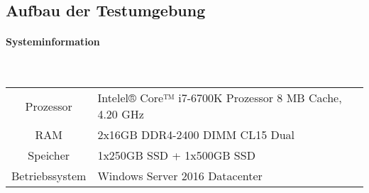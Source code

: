 %
\subsection{Aufbau der Testumgebung}
\paragraph{Systeminformation}\\
\begin{table}[htb]
\begin{tabularx}{\textwidth}{cXX}
Prozessor & Intelel® Core™ i7-6700K Prozessor 8 MB Cache, 4.20 GHz \\ 
\rowcolor{odd} RAM & 2x16GB DDR4-2400 DIMM CL15 Dual \\
Speicher & 1x250GB SSD + 1x500GB SSD \\ 
\rowcolor{odd} Betriebssystem & Windows Server 2016 Datacenter \\
\end{tabularx}
\end{table}

